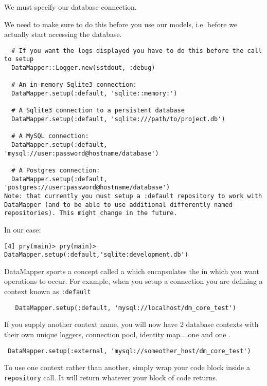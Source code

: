 
We must specify our database connection.

We need to make sure to do this before you use our models, 
i.e. before we actually start accessing the database.

\begin{verbatim}
  # If you want the logs displayed you have to do this before the call to setup
  DataMapper::Logger.new($stdout, :debug)

  # An in-memory Sqlite3 connection:
  DataMapper.setup(:default, 'sqlite::memory:')

  # A Sqlite3 connection to a persistent database
  DataMapper.setup(:default, 'sqlite:///path/to/project.db')

  # A MySQL connection:
  DataMapper.setup(:default, 'mysql://user:password@hostname/database')

  # A Postgres connection:
  DataMapper.setup(:default, 'postgres://user:password@hostname/database')
Note: that currently you must setup a :default repository to work with DataMapper (and to be able to use additional differently named repositories). This might change in the future.
\end{verbatim}

In our case:

\begin{verbatim}
[4] pry(main)> pry(main)> DataMapper.setup(:default,'sqlite:development.db')
\end{verbatim}


DataMapper sports a concept called a  which encapsulates the
 in which you want operations to occur. For example,
when you setup a connection you are defining a
context known as \verb|:default|

\begin{verbatim}
   DataMapper.setup(:default, 'mysql://localhost/dm_core_test')
\end{verbatim}
If you supply another context name, you will now have 2 database contexts
with their own unique loggers, connection pool, identity map....one
 and one .

\begin{verbatim}
 DataMapper.setup(:external, 'mysql://someother_host/dm_core_test')
\end{verbatim}
To use one context rather than another, simply wrap your code block inside
a \verb|repository| call. It will return whatever your block of code returns.

